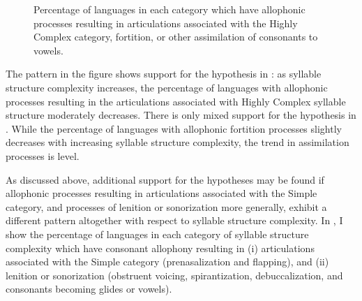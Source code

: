 \begin{figure}
\caption{\label{fig:7.2}Percentage of languages in each category which have allophonic processes resulting in articulations associated with the Highly Complex category, fortition, or other assimilation of consonants to vowels.}
\end{figure}

  The pattern in the figure shows support for the hypothesis in : as syllable structure complexity increases, the percentage of languages with allophonic processes resulting in the articulations associated with Highly Complex syllable structure moderately decreases. There is only mixed support for the hypothesis in . While the percentage of languages with allophonic fortition processes slightly decreases with increasing syllable structure complexity, the trend in assimilation processes is level.

  As discussed above, additional support for the hypotheses may be found if allophonic processes resulting in articulations associated with the Simple category, and processes of lenition or sonorization more generally, exhibit a different pattern altogether with respect to syllable structure complexity. In , I show the percentage of languages in each category of syllable structure complexity which have consonant allophony resulting in (i) articulations associated with the Simple category (prenasalization and flapping), and (ii) lenition or sonorization (obstruent voicing, spirantization, debuccalization, and consonants becoming glides or vowels).

